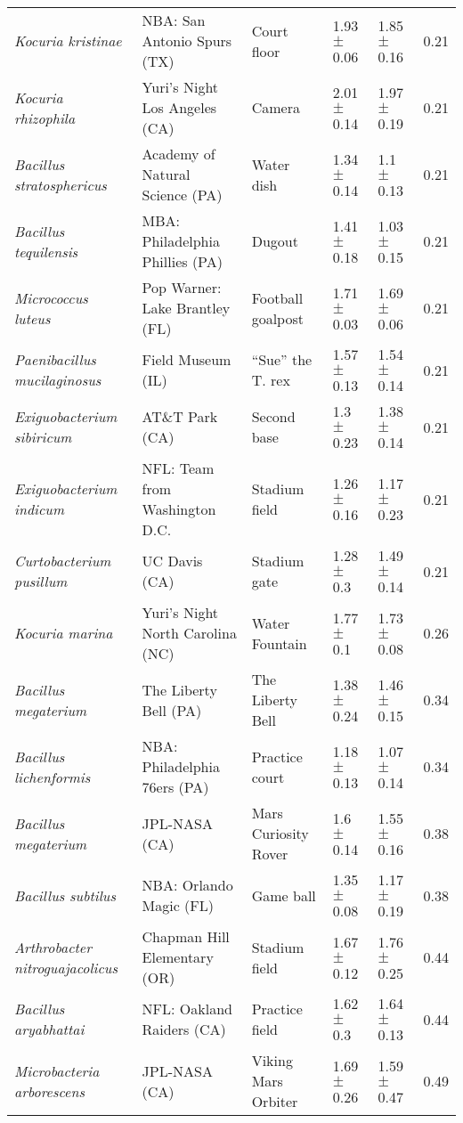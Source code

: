\begin{table}[]
{\begin{tabular}{@{}llllll@{}}
\textit{Kocuria kristinae} & NBA: San Antonio Spurs (TX) & Court floor & 1.93 $\pm$ 0.06 & 1.85 $\pm$ 0.16 & 0.21 \\
\textit{Kocuria rhizophila} & Yuri's Night Los Angeles (CA) & Camera & 2.01 $\pm$ 0.14 & 1.97 $\pm$ 0.19 & 0.21 \\
\textit{Bacillus stratosphericus} & Academy of Natural Science (PA) & Water dish & 1.34 $\pm$ 0.14 & 1.1 $\pm$ 0.13 & 0.21 \\
\textit{Bacillus tequilensis} & MBA: Philadelphia Phillies (PA) & Dugout & 1.41 $\pm$ 0.18 & 1.03 $\pm$ 0.15 & 0.21 \\
\textit{Micrococcus luteus} & Pop Warner: Lake Brantley (FL) & Football goalpost & 1.71 $\pm$ 0.03 & 1.69 $\pm$ 0.06 & 0.21 \\
\textit{Paenibacillus mucilaginosus} & Field Museum (IL) & ``Sue'' the T. rex & 1.57 $\pm$ 0.13 & 1.54 $\pm$ 0.14 & 0.21 \\
\textit{Exiguobacterium sibiricum} & AT\&T Park (CA) & Second base & 1.3 $\pm$ 0.23 & 1.38 $\pm$ 0.14 & 0.21 \\
\textit{Exiguobacterium indicum} & NFL: Team from Washington D.C. & Stadium field & 1.26 $\pm$ 0.16 & 1.17 $\pm$ 0.23 & 0.21 \\
\textit{Curtobacterium pusillum} & UC Davis (CA) & Stadium gate & 1.28 $\pm$ 0.3 & 1.49 $\pm$ 0.14 & 0.21 \\
\textit{Kocuria marina} & Yuri's Night North Carolina (NC) & Water Fountain & 1.77 $\pm$ 0.1 & 1.73 $\pm$ 0.08 & 0.26 \\
\textit{Bacillus megaterium} & The Liberty Bell (PA) & The Liberty Bell & 1.38 $\pm$ 0.24 & 1.46 $\pm$ 0.15 & 0.34 \\
\textit{Bacillus lichenformis} & NBA: Philadelphia 76ers (PA) & Practice court & 1.18 $\pm$ 0.13 & 1.07 $\pm$ 0.14 & 0.34 \\
\textit{Bacillus megaterium} & JPL-NASA (CA) & Mars Curiosity Rover & 1.6 $\pm$ 0.14 & 1.55 $\pm$ 0.16 & 0.38 \\
\textit{Bacillus subtilus} & NBA: Orlando Magic (FL) & Game ball & 1.35 $\pm$ 0.08 & 1.17 $\pm$ 0.19 & 0.38 \\
\textit{Arthrobacter nitroguajacolicus} & Chapman Hill Elementary (OR) & Stadium field & 1.67 $\pm$ 0.12 & 1.76 $\pm$ 0.25 & 0.44 \\
\textit{Bacillus aryabhattai} & NFL: Oakland Raiders (CA) & Practice field & 1.62 $\pm$ 0.3 & 1.64 $\pm$ 0.13 & 0.44 \\
\textit{Microbacteria arborescens} & JPL-NASA (CA) & Viking Mars Orbiter & 1.69 $\pm$ 0.26 & 1.59 $\pm$ 0.47 & 0.49 \\

\end{tabular}}
\end{table}
